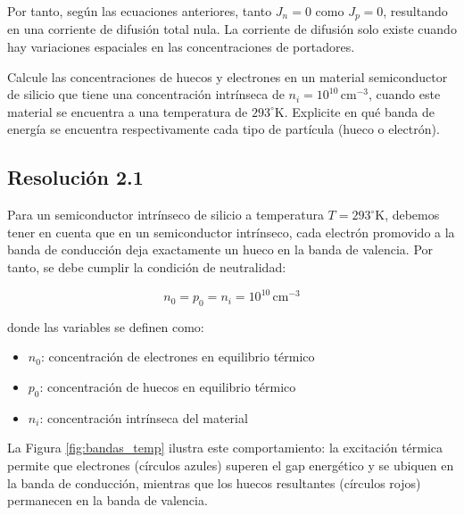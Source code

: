 \documentclass[
  11pt,
  letterpaper,
   addpoints,
   answers
  ]{exam}
\begin{document}
\begin{questions}
\begin{solution}
Por tanto, según las ecuaciones anteriores, tanto $J_n = 0$ como $J_p = 0$, resultando en una corriente de difusión total nula. La corriente de difusión solo existe cuando hay variaciones espaciales en las concentraciones de portadores.
\end{solution}

\question
Calcule las concentraciones de huecos y electrones en un material semiconductor de silicio que tiene una concentración intrínseca de $n_i = 10^{10}\,\text{cm}^{-3}$, cuando este material se encuentra a una temperatura de $293^\circ \text{K}$. Explicite en qué banda de energía se encuentra respectivamente cada tipo de partícula (hueco o electrón).
\begin{solution}
    \subsection*{Resolución 2.1}
Para un semiconductor intrínseco de silicio a temperatura $T = 293^\circ$K, debemos tener en cuenta que en un semiconductor intrínseco, cada electrón promovido a la banda de conducción deja exactamente un hueco en la banda de valencia. Por tanto, se debe cumplir la condición de neutralidad:

    \begin{equation}
        n_0 = p_0 = n_i = 10^{10}\,\text{cm}^{-3}
    \end{equation}

    donde las variables se definen como:
    \begin{itemize}
        \item $n_0$: concentración de electrones en equilibrio térmico
        \item $p_0$: concentración de huecos en equilibrio térmico  
        \item $n_i$: concentración intrínseca del material
    \end{itemize}

    La Figura \ref{fig:bandas_temp} ilustra este comportamiento: la excitación térmica permite que electrones (círculos azules) superen el gap energético y se ubiquen en la banda de conducción, mientras que los huecos resultantes (círculos rojos) permanecen en la banda de valencia.


\end{solution}
\end{questions}
\end{document}

